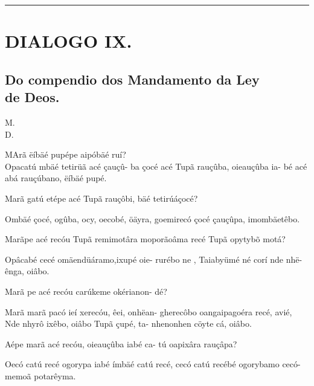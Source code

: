 \documentclass[openany,titlepage,12pt]{book}
\renewcommand{\chaptermark}[1]{\markboth{#1}{}}
\renewcommand{\sectionmark}[1]{\gdef\rightmark{#1}}
\newcommand{\lgS}{\char"017F}
\newcommand{\comecalista}[5]{
    \hspace*{-11.7pt}
    \begin{minipage}[t]{0.08\linewidth}
        \flushright #1\\#2
    \end{minipage}
    \hspace{0pt}
    \begin{minipage}[t]{0.94\linewidth}
        \lettrine
        [findent =2pt, nindent=0pt,  lines=2]
        {#3}{#4}#5
    \end{minipage}
    \vspace*{-3pt}
}
\begin{document}
\vspace{2pt}
\par\noindent\rule{\textwidth}{0.4pt}
\unskip\vspace*{2pt}
\section{DIALOGO IX.}
\unskip\vspace{2pt}
\subsection{Do compendio dos Mandamento da Ley\\de Deos.}

\chaptermark{Dialogo IX.}
\sectionmark{Não levantarás fal\lgS o te\lgS tem.}
\vspace*{-8pt}

\comecalista{M.}{D.}{M}{A}
{rã ëíbäé pupépe aipóbäé ruí?\\
 Opacatú mbäé tetirüã acé çauçû-
 ba çocé acé Tupã rauçûba, oieauçûba ia-
 bé acé abá rauçúbano, ëíbäé pupé.
}
\begin{alternate}
    \item Marã gatú etépe acé Tupã rauçôbi, bäé
        tetirúáçocé?
    \item Ombäé çocé, ogûba, ocy, oecobé, öäyra,
        goemirecó çocé çauçûpa, imombäetêbo.
    \item  Marãpe acé recóu Tupã remimotâra\linebreak
        \newpage
        moporãoâma recé Tupã opytybõ motá?
    \item Opâcabé cecé omäendüáramo,ixupé oie-
        rurébo ne , Taiabyümé né corí nde nhë-
        ênga, oiâbo.
    \item  Marã pe acé recóu carúkeme okérianon-
        dé?
    \item Marã marã pacó ieí xerecóu, êei, onhëan-
        gherecôbo oangaipagoéra recé, avié,\linebreak
        Nde nhyrô ixêbo, oiâbo Tupã çupé, ta-
        nhenonhen cöyte cá, oiâbo.
    \item Aépe marã acé recóu, oieauçûba iabé ca-
        tú oapixâra rauçâpa?
    \item Oecó catú recé ogorypa iabé ímbäé catú
        recé, cecó catú recébé ogorybamo cecó-\linebreak
        memoã potarêyma.
\end{alternate}
\end{document}
